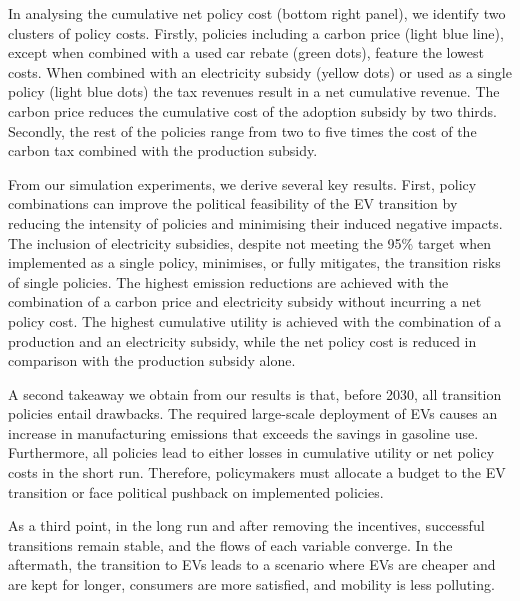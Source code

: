 \documentclass[12pt]{article}
\begin{document}
    In analysing the cumulative net policy cost (bottom right panel), we identify two clusters of policy costs. Firstly, policies including a carbon price (light blue line), except when combined with a used car rebate (green dots), feature the lowest costs. When combined with an electricity subsidy (yellow dots) or used as a single policy (light blue dots) the tax revenues result in a net cumulative revenue. The carbon price reduces the cumulative cost of the adoption subsidy by two thirds. Secondly, the rest of the policies range from two to five times the cost of the carbon tax combined with the production subsidy.

	From our simulation experiments, we derive several key results. First, policy combinations can improve the political feasibility of the EV transition by reducing the intensity of policies and minimising their induced negative impacts. The inclusion of electricity subsidies, despite not meeting the 95\% target when implemented as a single policy, minimises, or fully mitigates, the transition risks of single policies. The highest emission reductions are achieved with the combination of a carbon price and electricity subsidy without incurring a net policy cost. The highest cumulative utility is achieved with the combination of a production and an electricity subsidy, while the net policy cost is reduced in comparison with the production subsidy alone.

	A second takeaway we obtain from our results is that, before 2030, all transition policies entail drawbacks. The required large-scale deployment of EVs causes an increase in manufacturing emissions that exceeds the savings in gasoline use. Furthermore, all policies lead to either losses in cumulative utility or net policy costs in the short run. Therefore, policymakers must allocate a budget to the EV transition or face political pushback on implemented policies.

	As a third point, in the long run and after removing the incentives, successful transitions remain stable, and the flows of each variable converge. In the aftermath, the transition to EVs leads to a scenario where EVs are cheaper and are kept for longer, consumers are more satisfied, and mobility is less polluting.
\end{document}
